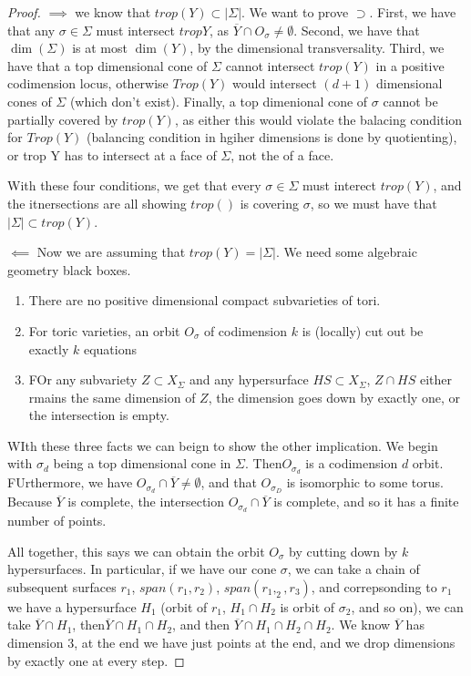 \documentclass[12pt]{memoir}
\theoremstyle{definition}
\begin{document}
\begin{proof}
   $\implies$ we know that $trop(Y) \subset |\Sigma|$. We want to prove $\supset$. First, we have that any $\sigma \in \Sigma$ must intersect $trop Y$, as $\overline{Y} \cap O_\sigma \neq \emptyset$. Second, we have that $\dim(\Sigma)$ is at most $\dim(Y)$, by the dimensional transversality. Third, we have that a top dimensional cone of $\Sigma$ cannot intersect $trop(Y)$ in a positive codimension locus, otherwise $Trop(Y)$ would intersect $(d+1)$ dimensional cones of $\Sigma$ (which don't exist). Finally, a top dimenional cone of $\sigma$ cannot be partially covered by $trop(Y)$, as either this would violate the balacing condition for $Trop (Y)$ (balancing condition in hgiher dimensions is done by quotienting), or trop Y has to intersect at a face of $\Sigma$, not the of a face. 
   
   
   With these four conditions, we get that every $\sigma \in \Sigma$ must interect $trop(Y)$, and the itnersections are all showing $trop()$ is covering $\sigma$, so we must have that $|\Sigma| \subset trop(Y)$.


   $\impliedby$ Now we are assuming that $trop(Y) = |\Sigma|$. We need some algebraic geometry black boxes.

   \begin{enumerate}
       \item There are no positive dimensional compact subvarieties of tori.
       \item For toric varieties, an orbit $O_\sigma$ of codimension $k$ is (locally) cut out be exactly $k$ equations
       \item FOr any subvariety $Z \subset X_\Sigma$ and any hypersurface $HS \subset X_\Sigma$, $Z \cap HS$ either rmains the same dimension of $Z$, the dimension goes down by exactly one, or the intersection is empty.
   \end{enumerate}

   WIth these three facts we can beign to show the other implication. We begin with $\sigma_d$ being a top dimensional cone in $\Sigma$. Then$ O_{\sigma_d}$ is a codimension $d$ orbit. FUrthermore, we have $O_{\sigma_d} \cap \overline{Y} \neq \emptyset$, and that $O_{\sigma_D}$ is isomorphic to some torus. Because $\overline{Y}$ is complete, the intersection $O_{\sigma_d} \cap \overline{Y}$ is complete, and so it has a finite number of points.


   All together, this says we can obtain the orbit $O_\sigma$ by cutting down by $k$ hypersurfaces. In particular, if we have our cone $\sigma$, we can take a chain of subsequent surfaces $r_1$, $span(r_1,r_2)$, $span(r_1,_2,r_3)$, and correpsonding to $r_1$ we have a hypersurface $H_1$ (orbit of $r_1$, $H_1 \cap H_2$ is orbit of $\sigma_2$, and so on), we can take $\overline{Y} \cap H_1$, then$ \overline{Y}\cap H_1 \cap H_2$, and then $\overline{Y}\cap H_1 \cap H_2 \cap H_2$. We know $\overline{Y}$ has dimension 3, at the end we have just points at the end, and we drop dimensions by exactly one at every step.





\end{proof}
\end{document}
